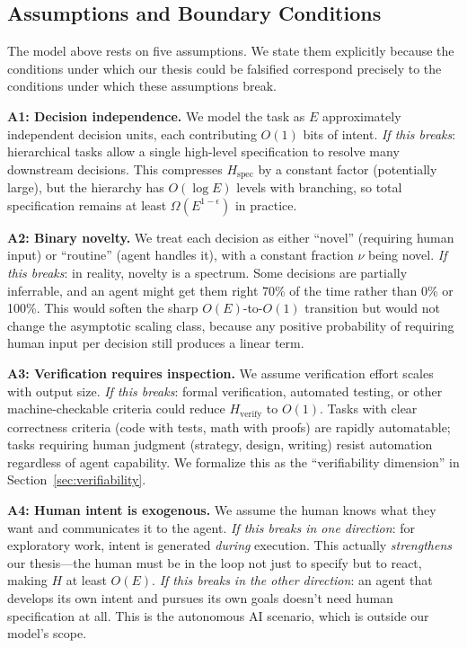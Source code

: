 \documentclass[11pt,a4paper]{article}
\begin{document}
\subsection{Assumptions and Boundary Conditions}
\label{sec:assumptions}

The model above rests on five assumptions. We state them explicitly because the conditions under which our thesis could be falsified correspond precisely to the conditions under which these assumptions break.

\textbf{A1: Decision independence.} We model the task as $E$ approximately independent decision units, each contributing $O(1)$ bits of intent. \emph{If this breaks}: hierarchical tasks allow a single high-level specification to resolve many downstream decisions. This compresses $H_{\text{spec}}$ by a constant factor (potentially large), but the hierarchy has $O(\log E)$ levels with branching, so total specification remains at least $\Omega(E^{1-\epsilon})$ in practice.

\textbf{A2: Binary novelty.} We treat each decision as either ``novel'' (requiring human input) or ``routine'' (agent handles it), with a constant fraction $\nu$ being novel. \emph{If this breaks}: in reality, novelty is a spectrum. Some decisions are partially inferrable, and an agent might get them right 70\% of the time rather than 0\% or 100\%. This would soften the sharp $O(E)$-to-$O(1)$ transition but would not change the asymptotic scaling class, because any positive probability of requiring human input per decision still produces a linear term.

\textbf{A3: Verification requires inspection.} We assume verification effort scales with output size. \emph{If this breaks}: formal verification, automated testing, or other machine-checkable criteria could reduce $H_{\text{verify}}$ to $O(1)$. Tasks with clear correctness criteria (code with tests, math with proofs) are rapidly automatable; tasks requiring human judgment (strategy, design, writing) resist automation regardless of agent capability. We formalize this as the ``verifiability dimension'' in Section~\ref{sec:verifiability}.

\textbf{A4: Human intent is exogenous.} We assume the human knows what they want and communicates it to the agent. \emph{If this breaks in one direction}: for exploratory work, intent is generated \emph{during} execution. This actually \emph{strengthens} our thesis---the human must be in the loop not just to specify but to react, making $H$ at least $O(E)$. \emph{If this breaks in the other direction}: an agent that develops its own intent and pursues its own goals doesn't need human specification at all. This is the autonomous AI scenario, which is outside our model's scope.
\end{document}
